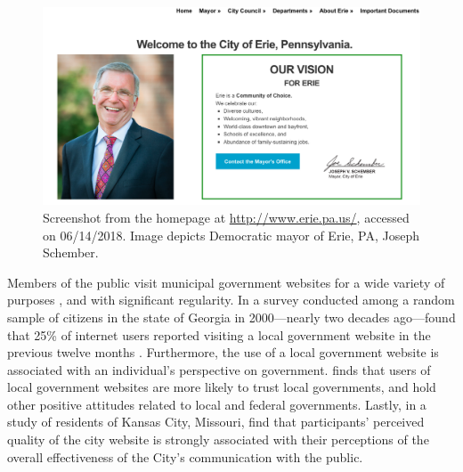 \documentclass[11pt]{article}
\begin{document}
\begin{figure}
\centering
\includegraphics[scale=0.35]{figures/eriemayor}
\caption{Screenshot from the homepage at \url{http://www.erie.pa.us/}, accessed on 06/14/2018. Image depicts  Democratic mayor of Erie, PA, Joseph Schember.}
\label{fig:eriemayor}
\end{figure}


Members of the public visit municipal government websites for a wide variety of purposes \citet{sandoval2012government}, and with significant regularity. In a survey conducted among a random sample of citizens in the state of Georgia in 2000---nearly two decades ago---found that 25\% of internet users reported visiting a local government website in the previous twelve months \citep{thomas2003new}. Furthermore, the use of a local government website is associated with an individual's perspective on government. \citet{tolbert2006effects} finds that users of local government websites are more likely to trust local governments, and hold other positive attitudes related to local and federal governments. Lastly, in a study of residents of Kansas City, Missouri, \citet{ho2017government} find that participants' perceived quality of the city website is strongly associated with their perceptions of the overall effectiveness of the City's communication with the public.
\end{document}
